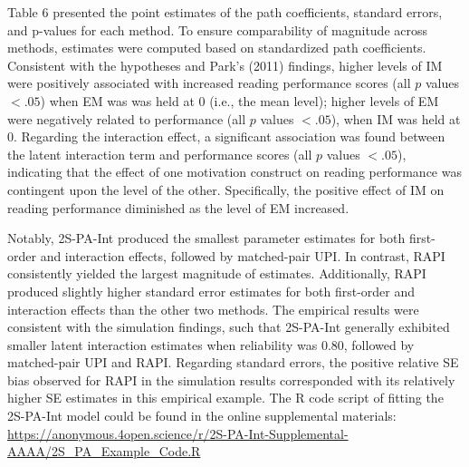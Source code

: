 \documentclass[
  man,mask]{apa6}
\begin{document}
Table 6 presented the point estimates of the path coefficients, standard errors, and p-values for each method. To ensure comparability of magnitude across methods, estimates were computed based on standardized path coefficients. Consistent with the hypotheses and Park's (2011) findings, higher levels of IM were positively associated with increased reading performance scores (all \(\textit{p}\) values \(< .05\)) when EM was was held at 0 (i.e., the mean level); higher levels of EM were negatively related to performance (all \(\textit{p}\) values \(< .05\)), when IM was held at 0. Regarding the interaction effect, a significant association was found between the latent interaction term and performance scores (all \(\textit{p}\) values \(< .05\)), indicating that the effect of one motivation construct on reading performance was contingent upon the level of the other. Specifically, the positive effect of IM on reading performance diminished as the level of EM increased.

Notably, 2S-PA-Int produced the smallest parameter estimates for both first-order and interaction effects, followed by matched-pair UPI. In contrast, RAPI consistently yielded the largest magnitude of estimates. Additionally, RAPI produced slightly higher standard error estimates for both first-order and interaction effects than the other two methods. The empirical results were consistent with the simulation findings, such that 2S-PA-Int generally exhibited smaller latent interaction estimates when reliability was 0.80, followed by matched-pair UPI and RAPI. Regarding standard errors, the positive relative SE bias observed for RAPI in the simulation results corresponded with its relatively higher SE estimates in this empirical example. The R code script of fitting the 2S-PA-Int model could be found in the online supplemental materials: \url{https://anonymous.4open.science/r/2S-PA-Int-Supplemental-AAAA/2S_PA_Example_Code.R}
\end{document}
